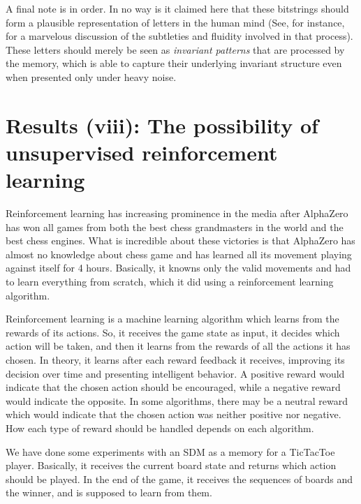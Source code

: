 A final note is in order.  In no way is it claimed here that these bitstrings should form a plausible representation of letters in the human mind (See, for instance, \citet{hofstadter1995seeing} for a marvelous discussion of the subtleties and fluidity involved in that process).  These letters should merely be seen as \emph{invariant patterns} that are processed by the memory, which is able to capture their underlying invariant structure even when presented only under heavy noise.












\chapter{Results (viii): The possibility of unsupervised reinforcement learning}

Reinforcement learning has increasing prominence in the media after AlphaZero has won all games from both the best chess grandmasters in the world and the best chess engines. What is incredible about these victories is that AlphaZero has almost no knowledge about chess game and has learned all its movement playing against itself for 4 hours. Basically, it knowns only the valid movements and had to learn everything from scratch, which it did using a reinforcement learning algorithm.

Reinforcement learning is a machine learning algorithm which learns from the rewards of its actions. So, it receives the game state as input, it decides which action will be taken, and then it learns from the rewards of all the actions it has chosen. In theory, it learns after each reward feedback it receives, improving its decision over time and presenting intelligent behavior. A positive reward would indicate that the chosen action should be encouraged, while a negative reward would indicate the opposite. In some algorithms, there may be a neutral reward which would indicate that the chosen action was neither positive nor negative. How each type of reward should be handled depends on each algorithm.

We have done some experiments with an SDM as a memory for a TicTacToe player. Basically, it receives the current board state and returns which action should be played. In the end of the game, it receives the sequences of boards and the winner, and is supposed to learn from them.

